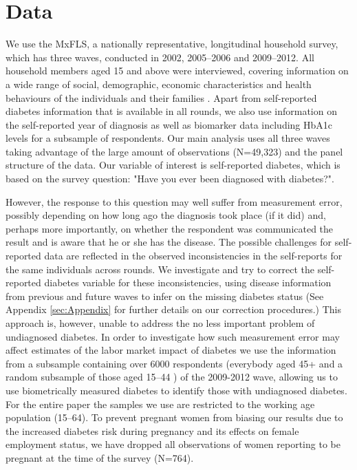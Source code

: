 \documentclass[12pt,english,british]{article}
\begin{document}
\section{\label{sec:Data}Data}

We use the \acf{MxFLS}, a nationally representative, longitudinal household survey, which has three
waves, conducted in 2002, 2005--2006 and 2009--2012. All household members aged 15 and above were interviewed, covering information on a wide range of social, demographic, economic characteristics and
health behaviours of the individuals and their families
\citep{Rubalcava2013}. Apart from self-reported diabetes information that is available in all rounds, we also use information
on the self-reported year of diagnosis as well as biomarker data including \ac{HbA1c} levels for a subsample of respondents.  Our main analysis uses all three waves 
taking advantage of the large amount of observations (N=49,323) and the panel structure
of the data. Our variable of interest is self-reported
diabetes, which is based on the survey question: "Have you
ever been diagnosed with diabetes?". 


However, the response to this question may well suffer from measurement error, possibly depending on how long ago the diagnosis took place (if it did) and, perhaps more importantly, on whether the respondent was communicated the result and is aware that he or she has the disease. The possible challenges for self-reported data are reflected in the observed inconsistencies in the self-reports for the same individuals across rounds. 
We investigate and try to correct the self-reported diabetes variable for these inconsistencies, using disease information from previous and future waves to infer on the missing diabetes status (See Appendix \ref{sec:Appendix} for further details on our correction procedures.)  This approach is, however, unable to address the no less important problem of undiagnosed diabetes. In order to investigate how such measurement error may affect estimates of the labor market impact of diabetes
we use the information from a subsample containing over 6000 respondents (everybody aged 45+  and a random subsample of those aged 15--44 \citep{Crimmins2015}) of the 2009-2012 wave, allowing us to use biometrically measured diabetes to identify those with undiagnosed diabetes. For the entire paper the samples we use are restricted to the working age population (15--64). To prevent pregnant women from biasing our results due to the increased diabetes risk during pregnancy and its effects on female employment status, we have dropped all observations of women reporting to be pregnant at the time of the survey (N=764).
\end{document}
